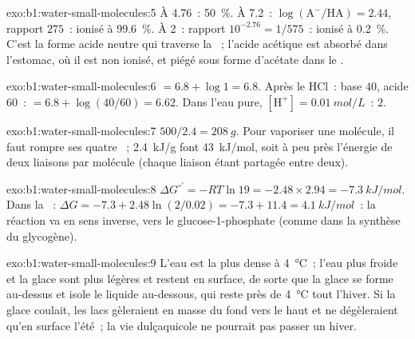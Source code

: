 \begin{solution}{exo:b1:water-small-molecules:5}
À  4.76~: \qty{50}{\%}. À 7.2~: $\log(\mathrm{A^-}/\mathrm{HA}) =
2.44$, rapport $275$~: ionisé à \qty{99.6}{\%}. À  2~: rapport $10^{-2.76} =
1/575$~: ionisé à \qty{0.2}{\%}. C'est la forme acide neutre qui
traverse la ~; l'acide acétique est absorbé dans
l'estomac, où il est non ionisé, et piégé sous forme d'acétate dans le
.
\end{solution}

\begin{solution}{exo:b1:water-small-molecules:6}
 $= 6.8 + \log 1 = 6.8$. Après le HCl~: base $40$, acide $60$~:  $= 6.8 +
\log(40/60) = 6.62$. Dans l'eau pure, $[\mathrm{H^+}] = \qty{0.01}{mol/L}$~:
 $2$.
\end{solution}

\begin{solution}{exo:b1:water-small-molecules:7}
$500/2.4 = \qty{208}{g}$. Pour vaporiser une molécule, il faut rompre
ses quatre ~; \qty{2.4}{kJ/g} font \qty{43}{kJ/mol},
soit à peu près l'énergie de deux liaisons par molécule (chaque liaison
étant partagée entre deux).
\end{solution}

\begin{solution}{exo:b1:water-small-molecules:8}
$\Delta G^{\circ\prime} = -RT\ln 19 = -2.48\times 2.94 =
\qty{-7.3}{kJ/mol}$. Dans la ~: $\Delta G = -7.3 + 2.48\ln(2/0.02) =
-7.3 + 11.4 = \qty{+4.1}{kJ/mol}$~: la réaction va en sens inverse, vers
le glucose-1-phosphate (comme dans la synthèse du glycogène).
\end{solution}

\begin{solution}{exo:b1:water-small-molecules:9}
L'eau est la plus dense à \qty{4}{\celsius}~; l'eau plus froide et la
glace sont plus légères et restent en surface, de sorte que la glace se
forme au-dessus et isole le liquide au-dessous, qui reste près de
\qty{4}{\celsius} tout l'hiver. Si la glace coulait, les lacs
gèleraient en masse du fond vers le haut et ne dégèleraient qu'en
surface l'été~; la vie dulçaquicole ne pourrait pas passer un hiver.
\end{solution}

